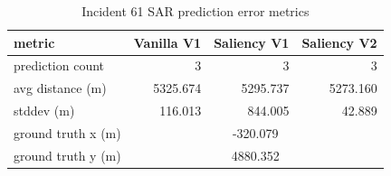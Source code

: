 \begin{table}[ht]
\centering
\caption{Incident 61 SAR prediction error metrics}
\label{tab:sar-incident-61}
\begin{tabular}{lrrr}
\hline
metric & Vanilla V1 & Saliency V1 & Saliency V2 \\
\hline
prediction count & 3 & 3 & 3 \\
avg distance (m) & 5325.674 & 5295.737 & 5273.160 \\
stddev (m) & 116.013 & 844.005 & 42.889 \\
ground truth x (m) & \multicolumn{3}{c}{-320.079} \\
ground truth y (m) & \multicolumn{3}{c}{4880.352} \\
\hline
\end{tabular}
\end{table}
